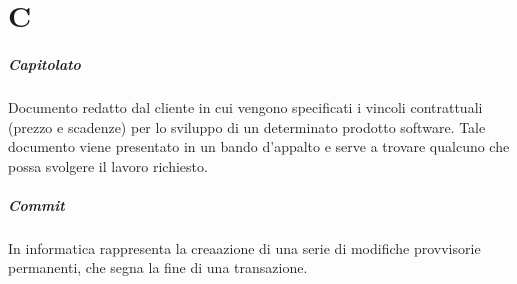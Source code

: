 \chapter{C}

\paragraph*{Capitolato}
Documento redatto dal cliente in cui vengono specificati i vincoli contrattuali (prezzo e scadenze) per lo sviluppo di un determinato prodotto software. Tale documento viene presentato in un bando d'appalto e serve a trovare qualcuno che possa svolgere il lavoro richiesto.

\paragraph*{Commit}
In informatica rappresenta la creaazione di una serie di modifiche provvisorie permanenti, che segna la fine di una transazione.